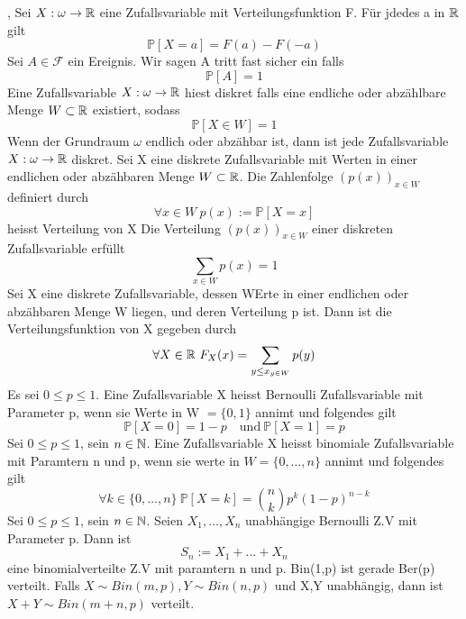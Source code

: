\sep
{} \newline
Sei \( X : \omega \rightarrow \mathbb{R} \) eine Zufallsvariable mit Verteilungsfunktion F. Für jdedes a in \(\mathbb{R}\) gilt \[ \mathbb{P}[X = a] = F(a) - F(-a)\]
\Def[3.2] \newline
Sei \( A \in \mathcal{F} \) ein Ereignis. Wir sagen A tritt fast sicher ein falls \[ \mathbb{P}[A] = 1\]
 \newline
Eine Zufallsvariable \( X : \omega \rightarrow \mathbb{R} \) hiest diskret falls eine endliche oder abzählbare Menge \( W \subset \mathbb{R}\) existiert, sodass \[ \mathbb{P}[X \in W ] = 1\]
\Bem[3.5] Wenn der Grundraum \( \omega\) endlich oder abzähbar ist, dann ist jede Zufallsvariable \( X : \omega \rightarrow \mathbb{R}\) diskret.
 \newline
Sei X eine diskrete Zufallsvariable mit Werten in einer endlichen oder abzähbaren Menge \( W \subset \mathbb{R}\). Die Zahlenfolge \((p(x))_{x \in W}\) definiert durch \[ \forall x \in W \ p(x) := \mathbb{P}[X = x]\] heisst Verteilung von X
\Satz[3.7] Die Verteilung \((p(x))_{x \in W}\) einer diskreten Zufallsvariable erfüllt \[ \sum_{x \in W} p(x) = 1\]
\Satz[3.9] Sei X eine diskrete Zufallsvariable, dessen WErte in einer endlichen oder abzähbaren Menge W liegen, und deren Verteilung p ist. Dann ist die Verteilungsfunktion von X gegeben durch \[ \forall X \in \mathbb{R} \ F_X(x) = \sum_{y \leq x_{y \in W}}p(y)\]
 \newline
Es sei \( 0 \leq p \leq 1\). Eine Zufallsvariable X heisst Bernoulli Zufallsvariable mit Parameter p, wenn sie Werte in W \( = \{0,1\}\) annimt und folgendes gilt \[ \mathbb{P}[X=0] = 1-p \quad \text{und} \ \mathbb{P}[X=1] = p\]
\Def[3.11 Binomialverteilung] \newline
Sei \( 0 \leq p \leq 1\), sein \( n \in \mathbb{N}\). Eine Zufallsvariable X heisst binomiale Zufallsvariable mit Paramtern n und p, wenn sie werte in \( W = \{ 0, \dots , n\}\) annimt und folgendes gilt \[\forall k \in \{0, \dots , n\} \ \mathbb{P}[X=k] = \binom{n}{k} p^k(1-p)^{n-k}\]
 \newline
Sei \( 0 \leq p \leq 1\), sein \( n \in \mathbb{N}\). Seien \( X_1, \dots, X_n\) unabhängige Bernoulli Z.V mit Parameter p. Dann ist \[ S_n := X_1 + \dots + X_n\] eine binomialverteilte Z.V mit paramtern n und p.
\Bem[3.14] \newline
Bin(1,p) ist gerade Ber(p) verteilt. Falls \(X \sim Bin(m,p), Y \sim Bin(n,p) \) und X,Y unabhängig, dann ist \(X + Y \sim Bin(m+n, p)\)  verteilt.

